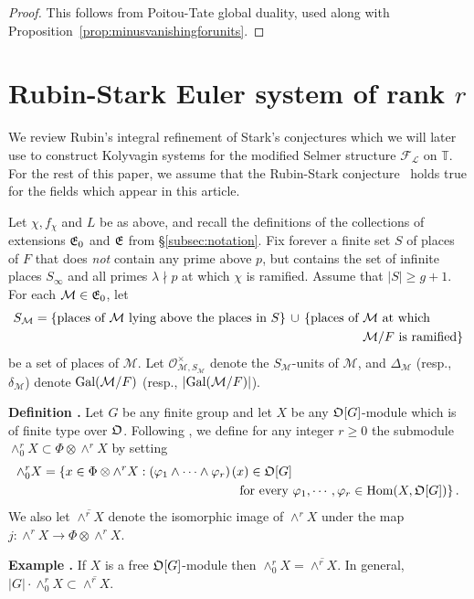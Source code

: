 \documentclass[12pt]{amsart}
\numberwithin{equation}{section}
\newenvironment{define}{\par\medskip\noindent\refstepcounter{thm}
\bgroup{\hspace*{-0.15 cm}\bf{Definition}
\thethm.}\bgroup}{\egroup \egroup\par\medskip}
\newenvironment{example}{\par\medskip\noindent\refstepcounter{thm}
\bgroup{\hspace*{-0.15 cm}\bf{Example}
\thethm.}\bgroup}{\egroup \egroup\par\medskip}
\begin{document}
\begin{proof}
This follows from Poitou-Tate global duality, used along with Proposition~\ref{prop:minusvanishingforunits}.
\end{proof}

\section{Rubin-Stark Euler system of rank $r$}
\label{sec:RS}
We review Rubin's \cite{ru96} integral refinement of Stark's conjectures which we will later use to construct Kolyvagin systems for the modified Selmer structure ${\mathcal{F}}_{\mathcal{L}}$ on ${\mathbb{T}}$. For the rest of this paper, we assume that the Rubin-Stark conjecture~\cite[Conjecture~$\textup{B}^{\prime}$]{ru96} holds true for the fields which appear in this article.

Let $\chi,f_\chi$ and $L$ be as above, and recall the definitions of the collections of extensions $\frak{E}_0$ and $\frak{E}$ from \S\ref{subsec:notation}. Fix forever a finite set $S$ of places of $F$ that does \emph{not} contain any prime above $p$, but contains the set of infinite places $S_\infty$ and all primes $\lambda \nmid p$ at which $\chi$ is ramified. Assume that $|S| \geq g+1$. For each $\mathcal{M} \in \frak{E}_0$, let
\begin{align*}S_{\mathcal{M}}=\{\hbox{places of } \mathcal{M} \hbox{ lying above the places in } S\}\, \cup \, \{\hbox{places of }& \mathcal{M} \hbox{ at which } 
\\&\mathcal{M}/F \hbox{ is ramified}\}\end{align*}
be a set of places of $\mathcal{M}$. Let $\mathcal{O}_{\mathcal{M},S_\mathcal{M}}^{\times}$ denote the $S_\mathcal{M}$-units of $\mathcal{M}$, and $\Delta_\mathcal{M}$ ({resp.}, $\delta_\mathcal{M}$) denote $\hbox{Gal}(\mathcal{M}/F)$ ({resp.}, $|\hbox{Gal}(\mathcal{M}/F)|$).  

\begin{define}
\label{def:rubinswedge0}
Let $G$ be any finite group and let $X$ be any ${\frak{O}}[G]$-module which is of finite type over ${\frak{O}}$. Following \cite{ru96}, we define for any  integer $r \geq 0$ the submodule $\wedge^r_0 X \subset \Phi\otimes\wedge^r X $
by setting
\begin{align*} \wedge^r_0 X=\left\{x \in \Phi\otimes\wedge^r X: (\varphi_1\wedge\cdots\wedge\varphi_r)\right.&(x)\in {\frak{O}}[G]\\
&\left. \hbox{ for every } \varphi_1,\cdots,\varphi_r \in \textup{Hom}(X,{\frak{O}}[G])\right\}.
\end{align*}
We also let $\overline{\wedge^r X}$ denote the isomorphic image of $\wedge^r X$ under the map $j: \wedge^r X{\rightarrow} \Phi\otimes\wedge^r X$.
\end{define}
\begin{example}
\label{example}
If $X$ is a free ${\frak{O}}[G]$-module then $\wedge^r_0 X =\overline{\wedge^r X}$. In general, $|G|\cdot\wedge^r_0 X\subset\overline{\wedge^r X}$.
 \end{example}
\end{document}
